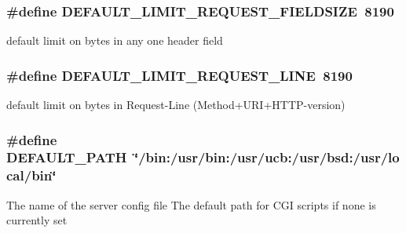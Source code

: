 \subsubsection[{\texorpdfstring{D\+E\+F\+A\+U\+L\+T\+\_\+\+L\+I\+M\+I\+T\+\_\+\+R\+E\+Q\+U\+E\+S\+T\+\_\+\+F\+I\+E\+L\+D\+S\+I\+ZE}{DEFAULT_LIMIT_REQUEST_FIELDSIZE}}]{\setlength{\rightskip}{0pt plus 5cm}\#define D\+E\+F\+A\+U\+L\+T\+\_\+\+L\+I\+M\+I\+T\+\_\+\+R\+E\+Q\+U\+E\+S\+T\+\_\+\+F\+I\+E\+L\+D\+S\+I\+ZE~8190}\hypertarget{group__APACHE__CORE__DAEMON_ga8891efcf92c7e9e13bbe541d694340d2}{}\label{group__APACHE__CORE__DAEMON_ga8891efcf92c7e9e13bbe541d694340d2}
default limit on bytes in any one header field 
\subsubsection[{\texorpdfstring{D\+E\+F\+A\+U\+L\+T\+\_\+\+L\+I\+M\+I\+T\+\_\+\+R\+E\+Q\+U\+E\+S\+T\+\_\+\+L\+I\+NE}{DEFAULT_LIMIT_REQUEST_LINE}}]{\setlength{\rightskip}{0pt plus 5cm}\#define D\+E\+F\+A\+U\+L\+T\+\_\+\+L\+I\+M\+I\+T\+\_\+\+R\+E\+Q\+U\+E\+S\+T\+\_\+\+L\+I\+NE~8190}\hypertarget{group__APACHE__CORE__DAEMON_ga085b56b77705764631506c08e928e5d7}{}\label{group__APACHE__CORE__DAEMON_ga085b56b77705764631506c08e928e5d7}
default limit on bytes in Request-\/\+Line (Method+\+U\+R\+I+\+H\+T\+T\+P-\/version) 
\subsubsection[{\texorpdfstring{D\+E\+F\+A\+U\+L\+T\+\_\+\+P\+A\+TH}{DEFAULT_PATH}}]{\setlength{\rightskip}{0pt plus 5cm}\#define D\+E\+F\+A\+U\+L\+T\+\_\+\+P\+A\+TH~\char`\"{}/bin\+:/usr/bin\+:/usr/ucb\+:/usr/bsd\+:/usr/local/bin\char`\"{}}\hypertarget{group__APACHE__CORE__DAEMON_ga72c1937b26ce9a87266ca6c802b047a0}{}\label{group__APACHE__CORE__DAEMON_ga72c1937b26ce9a87266ca6c802b047a0}
The name of the server config file The default path for C\+GI scripts if none is currently set 
